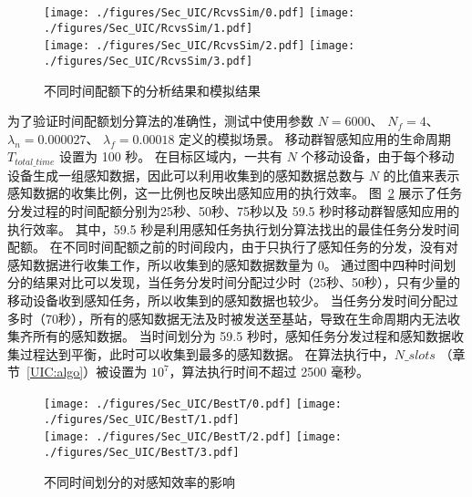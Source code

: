 \begin{figure}[!h]
  \centering
  {\texttt{[image: ./figures/Sec\_UIC/RcvsSim/0.pdf]}}
  {\texttt{[image: ./figures/Sec\_UIC/RcvsSim/1.pdf]}}\\
  {\texttt{[image: ./figures/Sec\_UIC/RcvsSim/2.pdf]}}
  {\texttt{[image: ./figures/Sec\_UIC/RcvsSim/3.pdf]}}
  \vspace{-0.5em}
  \caption{不同时间配额下的分析结果和模拟结果}
  \vspace{-1em}
  \label{Figure_EntireTest}
\end{figure}

为了验证时间配额划分算法的准确性，测试中使用参数 $N=6000$、 $N_f=4$、 $\lambda_n = 0.000027$、 $\lambda_f=0.00018$ 定义的模拟场景。
移动群智感知应用的生命周期 $T_{total\_time}$ 设置为 100 秒。
在目标区域内，一共有 $N$ 个移动设备，由于每个移动设备生成一组感知数据，因此可以利用收集到的感知数据总数与 $N$ 的比值来表示感知数据的收集比例，这一比例也反映出感知应用的执行效率。
图~\ref{Figure_BestT} 展示了任务分发过程的时间配额分别为25秒、50秒、75秒以及 59.5 秒时移动群智感知应用的执行效率。
其中，59.5 秒是利用感知任务执行划分算法找出的最佳任务分发时间配额。
在不同时间配额之前的时间段内，由于只执行了感知任务的分发，没有对感知数据进行收集工作，所以收集到的感知数据数量为 $0$。
通过图中四种时间划分的结果对比可以发现，当任务分发时间分配过少时（25秒、50秒），只有少量的移动设备收到感知任务，所以收集到的感知数据也较少。
当任务分发时间分配过多时（70秒），所有的感知数据无法及时被发送至基站，导致在生命周期内无法收集齐所有的感知数据。
当时间划分为 59.5 秒时，感知任务分发过程和感知数据收集过程达到平衡，此时可以收集到最多的感知数据。
在算法执行中，$N\_slots$ （章节~\ref{UIC:algo}）被设置为 $10^7$，算法执行时间不超过 2500 毫秒。

\vspace{-1em}
\begin{figure}[!ht]
  \centering
  {\texttt{[image: ./figures/Sec\_UIC/BestT/0.pdf]}}
  {\texttt{[image: ./figures/Sec\_UIC/BestT/1.pdf]}}\\
  {\texttt{[image: ./figures/Sec\_UIC/BestT/2.pdf]}}
  {\texttt{[image: ./figures/Sec\_UIC/BestT/3.pdf]}}
  \vspace{-0.5em}
  \caption{不同时间划分的对感知效率的影响}
  \vspace{-1.5em}
  \label{Figure_BestT}
\end{figure}

